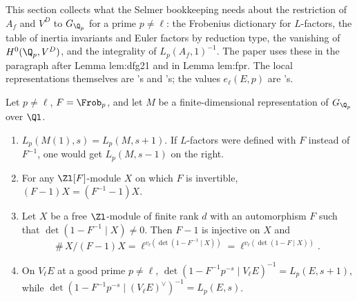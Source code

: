 This section collects what the Selmer bookkeeping needs about the restriction of $A_f$ and $V^D$ to $G_{\Q_p}$ for a prime $p\ne\ell$: the Frobenius
dictionary for $L$-factors, the table of inertia invariants and Euler factors by reduction type, the vanishing of $H^0(\Q_p,V^D)$, and the integrality
of $L_p(A_f,1)^{-1}$. The paper uses these in the paragraph after Lemma lem:dfg21 and in Lemma lem:fpr. The local representations themselves are
's and 's; the values $e_\ell(E,p)$ are 's.

\begin{proposition}\label{prop:blochkato:frobenius-dictionary}
Let $p\ne\ell$, $F=\Frob_p$, and let $M$ be a finite-dimensional representation of $G_{\Q_p}$ over $\Ql$.
\begin{enumerate}[label=(\alph*)]
\item $L_p(M(1),s)=L_p(M,s+1)$. If $L$-factors were defined with $F$ instead of $F^{-1}$, one would get $L_p(M,s-1)$ on the right.
\item For any $\Zl[F]$-module $X$ on which $F$ is invertible, $(F-1)X=(F^{-1}-1)X$.
\item Let $X$ be a free $\Zl$-module of finite rank $d$ with an automorphism $F$ such that $\det(1-F^{-1}\mid X)\ne0$. Then $F-1$ is injective on $X$ and
\[
\#\,X/(F-1)X=\ell^{v_\ell(\det(1-F^{-1}\mid X))}=\ell^{v_\ell(\det(1-F\mid X))}.
\]
\item On $V_\ell E$ at a good prime $p\ne\ell$, $\det(1-F^{-1}p^{-s}\mid V_\ell E)^{-1}=L_p(E,s+1)$, while $\det(1-F^{-1}p^{-s}\mid(V_\ell E)^\vee)^{-1}=L_p(E,s)$.
\end{enumerate}
\end{proposition}

